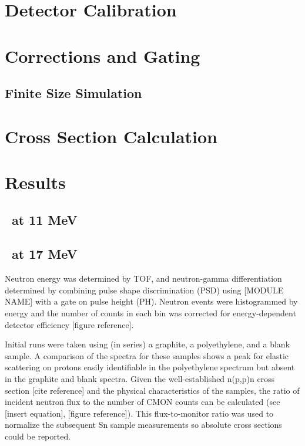 \section{Detector Calibration}
\section{Corrections and Gating}
\subsection{Finite Size Simulation}
\section{Cross Section Calculation}
\section{Results}
\subsection{\snTwelveFour\ \el at 11 MeV}
\subsection{\snTwelveFour\ \el at 17 MeV}

Neutron energy was determined by TOF, and neutron-gamma differentiation
determined by combining pulse shape discrimination (PSD) using [MODULE NAME] with
a gate on pulse height (PH). Neutron events were histogrammed by energy and the
number of counts in each bin was corrected for energy-dependent detector
efficiency [figure reference].

Initial runs were taken using (in series) a graphite, a polyethylene, and a blank
sample. A comparison of the spectra for these samples shows a peak for elastic
scattering on protons easily identifiable in the polyethylene spectrum but
absent in the graphite and blank spectra. Given the well-established n(p,p)n
cross section [cite reference] and the physical characteristics of the samples,
the ratio of incident neutron flux to the number of CMON counts can be calculated
(see [insert equation], [figure reference]). This flux-to-monitor ratio was used to normalize the
subsequent Sn sample measurements so absolute cross sections could be reported.

